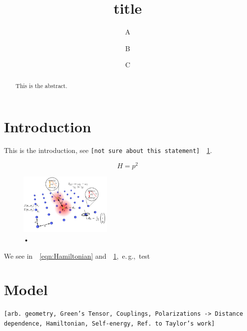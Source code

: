\documentclass[aps,pra,superscriptaddress,twocolumn]{revtex4-1}
\newcommand{\eg}{e.\,g.,\ }
\newcommand{\fref}[1]{\text{Fig.}~\ref{#1}}
\newcommand{\eeref}[1]{\text{Eqs.}~\eqref{#1}}
\newcommand{\commentSB}[1]{\texttt{\color{blue}[#1]}}
\newcommand{\commentSO}[1]{\texttt{\color{orange}[#1]}}
\begin{document}
\title{title}
\author{A}
\email{}
\author{B}
\email{}
\author{C}
\email{}

\begin{abstract}

This is the abstract. 

\end{abstract}

\maketitle

\section{Introduction}

This is the introduction, see \commentSB{not sure about this statement}~\fref{fig:setup}.

\begin{equation}
H = p^2
\label{eqn:Hamiltonian}
\end{equation}

\begin{figure}
\centering
\includegraphics[width=0.4\textwidth]{figures/setup_2.png} 
\caption{•}
\label{fig:setup}
\end{figure}

We see in~\eeref{eqn:Hamiltonian} and~\fref{fig:setup},~\eg test~\cite{cidrim_photon_2020}

\section{Model}
\commentSO{arb. geometry, Green's Tensor, Couplings, Polarizations -> Distance dependence, Hamiltonian, Self-energy, Ref. to Taylor's work}
\end{document}
